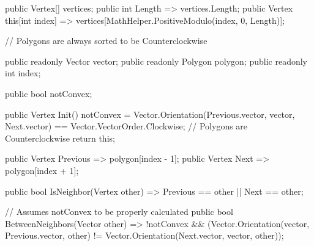 \documentclass[12pt]{article}
\begin{document}
\begin{Csharp}[caption=class Polygon]
public Vertex[] vertices;
public int Length => vertices.Length;
public Vertex this[int index] => vertices[MathHelper.PositiveModulo(index, 0, Length)];

// Polygons are always sorted to be Counterclockwise
\end{Csharp}

\begin{Csharp}[caption=class Vertex]
public readonly Vector vector;
public readonly Polygon polygon;
public readonly int index;

public bool notConvex;

public Vertex Init()
{
    notConvex = Vector.Orientation(Previous.vector, vector, Next.vector) == Vector.VectorOrder.Clockwise; // Polygons are Counterclockwise
    return this;
}

public Vertex Previous => polygon[index - 1];
public Vertex Next => polygon[index + 1];

public bool IsNeighbor(Vertex other) => Previous == other || Next == other;

// Assumes notConvex to be properly calculated
public bool BetweenNeighbors(Vector other) =>
    !notConvex && (Vector.Orientation(vector, Previous.vector, other) != Vector.Orientation(Next.vector, vector, other));
\end{Csharp}
\end{document}
